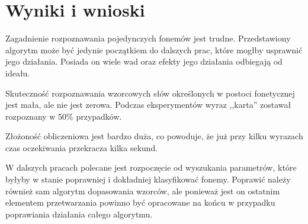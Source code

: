 \chapter{Wyniki i wnioski}
\label{cha:wnioski}

Zagadnienie rozpoznawania pojedynczych fonemów jest trudne. Przedstawiony algorytm może być jedynie początkiem do dalszych prac, które mogłby usprawnić jego działania. Posiada on wiele wad oraz efekty jego działania odbiegają od ideału.

Skuteczność rozpoznawania wzorcowych słów określonych w postoci fonetycznej jest mała, ale nie jest zerowa. Podczas eksperymentów wyraz ,,karta'' zostawał rozpoznany w 50\% przypadków. 

Złożoność obliczeniowa jest bardzo duża, co powoduje, że już przy kilku wyrazach czas oczekiwania przekracza kilka sekund.

W dalszych pracach polecane jest rozpoczęcie od wyszukania parametrów, które byłyby w stanie poprawniej i dokładniej klasyfikować fonemy. Poprawić należy również sam algorytm dopasowania wzorców, ale ponieważ jest on ostatnim elementem przetwarzania powinno być opracowane na końcu w przypadku poprawiania działania całego algorytmu.

